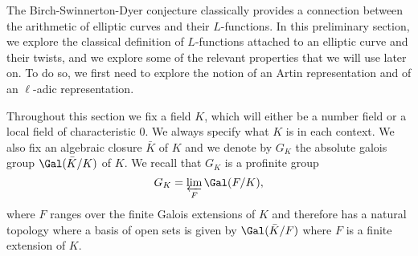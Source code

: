 The Birch-Swinnerton-Dyer conjecture classically provides a connection between the arithmetic of elliptic curves and their $L$-functions. In this preliminary section, we explore the classical definition of $L$-functions attached to an elliptic curve and their twists, and we explore some of the relevant properties that we will use later on. To do so, we first need to explore the notion of an Artin representation and of an $\ell$-adic representation. 

Throughout this section we fix a field $K$, which will either be a number field or a local field of characteristic $0$. We always specify what $K$ is in each context. We also fix an algebraic closure $\bar{K}$ of $K$ and we denote by $G_K$ the absolute galois group $\Gal(\bar{K}/K)$ of $K$. We recall that $G_K$ is a profinite group
$$G_K=\varprojlim_{F}\Gal(F/K),$$
where $F$ ranges over the finite Galois extensions of $K$ and therefore has a natural topology where a basis of open sets is given by $\Gal(\bar{K}/F)$ where $F$ is a finite extension of $K$.




